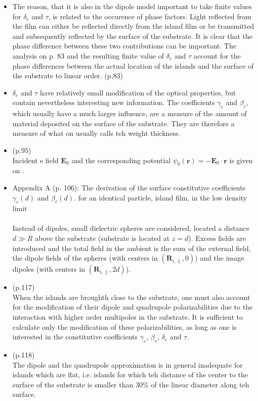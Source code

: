 \begin{itemize}
\item The reason, that it is also in the dipole model important to take 
finite values for $\delta_e$ and $\tau$, is related to the occurence of phase factors. Light reflected from
the film can either be reflected directly from the island film or be transmitted and subsequently
reflected by the surface of the substrate. It is clear that the phase difference between these
two contributions can be important. The analysis on p. 83 and the resulting finite value of 
$\delta_e$ and $\tau$ account for the phase differences between the actual location of the islands
and the surface of the substrate to linear order. (p.83)
\item $\delta_e$ and $\tau$ have relatively small modification of the optical properties, but contain 
nevertheless interesting new information. The coefficients $\gamma_e$ and $\beta_e$, which usually
have a much larger influence, are a measure of the amount of material deposited on the surface 
of the substrate. They are therefore a measure of what on usually calls teh weight thickness.

\item (p.95)\\
   Incident e field $ \boldsymbol E_0$ and the corresponding potential 
$\psi_0(\boldsymbol r) = - \boldsymbol E_0 \cdot \boldsymbol r$ is given on .

\item Appendix A (p. 106): The derivation of the surface constitutive coefficients $\gamma_e(d)$ and 
   $\beta_e(d)$. for an identical particle, island film, in the low density limit 
   \\
   \\
   Instead of dipoles, small dielectric spheres are considered, 
   located a distance $d \gg R$ above the substrate (substrate is located at $z = d$).
   Excess fields are introduced and the total field in the ambient is the sum of the external field,
   the dipole fields of the spheres (with centers in $(\boldsymbol R_{i,\parallel},0)$) and the
   image dipoles (with centers in $(\boldsymbol R_{i,\parallel},2d)$).

\item (p.117)\\
   When the islands are broughth close to the substrate, one must also account for the 
   modification of their dipole and quadrupole polarizabilities due to the interaction with higher order 
   multipoles in the substrate. It is sufficient to calculate only the modification of these 
   polarizabilities, as long as one is interested in the constitutive coefficients $\gamma_e$, $\beta_e$,
   $\delta_e$ and $\tau$. 
\item (p.118)\\
   The dipole and the quadrupole approximation is in general inadequate for islands which are flat, i.e.
   islands for which teh distance of the center to the surface of the substrate is smaller than 30\% of
   the linear diameter along teh surface. 
   

\end{itemize}
